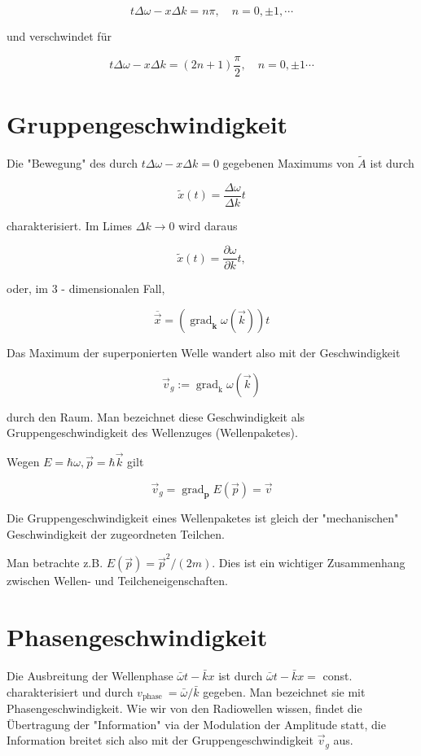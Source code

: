 \documentclass[10pt, letterpaper]{article}
\begin{document}
$$
t \Delta \omega-x \Delta k=n \pi, \quad n=0, \pm 1, \cdots
$$

und verschwindet für

$$
t \Delta \omega-x \Delta k=(2 n+1) \frac{\pi}{2}, \quad n=0, \pm 1 \cdots
$$

\section*{Gruppengeschwindigkeit}
Die "Bewegung" des durch $t \Delta \omega-x \Delta k=0$ gegebenen Maximums von $\tilde{A}$ ist durch

$$
\tilde{x}(t)=\frac{\Delta \omega}{\Delta k} t
$$

charakterisiert. Im Limes $\Delta k \rightarrow 0$ wird daraus

$$
\tilde{x}(t)=\frac{\partial \omega}{\partial k} t,
$$

oder, im 3 - dimensionalen Fall,

$$
\overline{\vec{x}}=\left(\operatorname{grad}_{\mathbf{k}} \omega(\vec{k})\right) t
$$

Das Maximum der superponierten Welle wandert also mit der Geschwindigkeit

$$
\vec{v}_{g}:=\operatorname{grad}_{\mathrm{k}} \omega(\vec{k})
$$

durch den Raum. Man bezeichnet diese Geschwindigkeit als Gruppengeschwindigkeit des Wellenzuges (Wellenpaketes).

Wegen $E=\hbar \omega, \vec{p}=\hbar \vec{k}$ gilt

$$
\vec{v}_{g}=\operatorname{grad}_{\mathbf{p}} E(\vec{p})=\vec{v}
$$

Die Gruppengeschwindigkeit eines Wellenpaketes ist gleich der "mechanischen" Geschwindigkeit der zugeordneten Teilchen.

Man betrachte z.B. $E(\vec{p})=\vec{p}^{2} /(2 m)$. Dies ist ein wichtiger Zusammenhang zwischen Wellen- und Teilcheneigenschaften.

\section*{Phasengeschwindigkeit}
Die Ausbreitung der Wellenphase $\bar{\omega} t-\bar{k} x$ ist durch $\bar{\omega} t-\bar{k} x=$ const. charakterisiert und durch $v_{\text {phase }}=\bar{\omega} / \bar{k}$ gegeben. Man bezeichnet sie mit Phasengeschwindigkeit. Wie wir von den Radiowellen wissen, findet die Übertragung der "Information" via der Modulation der Amplitude statt, die Information breitet sich also mit der Gruppengeschwindigkeit $\vec{v}_{g}$ aus.
\end{document}
